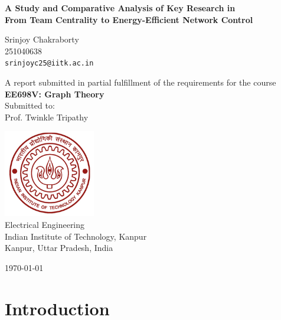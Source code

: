 \documentclass[10pt, a4paper]{article}
\begin{document}
\begin{titlepage}
    \centering
    {\Huge \bfseries A Study and Comparative Analysis of Key Research in \\ \vspace{0.5em} \LARGE From Team Centrality to Energy-Efficient Network Control \par}
    \vspace{2cm}
    {\Large Srinjoy Chakraborty \\ 
    251040638\\
    \texttt{srinjoyc25@iitk.ac.in} \par}
    \vspace{1cm}
    
    A report submitted in partial fulfillment of the requirements for the course
    \\[0.5cm]
    {\large \bfseries EE698V: Graph Theory}
    \\[1cm]
    
    Submitted to:
    \\
    {\large Prof. Twinkle Tripathy}
    
    \vspace{1cm}
    {\large \includegraphics[width=0.3\textwidth]{redlogo.jpg}} %
    \\[1cm]
    {\large Electrical Engineering}
    \\
    {\large Indian Institute of Technology, Kanpur}
    \\
    {\large Kanpur, Uttar Pradesh, India}
    \\[1cm]
    
    {\large \today \par}
\end{titlepage}

\tableofcontents
\newpage


\section{Introduction}
\end{document}
